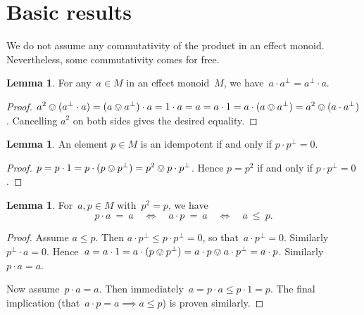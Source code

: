 \documentclass[10pt,conference]{IEEEtran}
\newcounter{counter}
\theoremstyle{definition}
\newtheorem{lemma}[counter]{Lemma}
\begin{document}
\section{Basic results}\label{sec:basicresults}

We do not assume any commutativity of the product in an effect
monoid. Nevertheless, some commutativity comes for free.

\begin{lemma}\label{lem:ssperpcommute}
    For any~$a \in M$ in an effect monoid~$M$,
        we have~$a\cdot a^\perp = a^\perp \cdot a$.
\end{lemma}
\begin{proof}
    $a^2 \ovee  (a^\perp
    \cdot a) = (a\ovee a^\perp) \cdot a  = 1\cdot a = a = a\cdot 1 = a \cdot (a\ovee a^\perp) = a^2 \ovee  (a
    \cdot a^\perp)$. Cancelling $a^2$ on both sides gives the desired
    equality.
\end{proof}

\begin{lemma}
    \label{lem:idempotentiff}
    An element $p\in M$ is an idempotent if and only if $p\cdot p^\perp = 0$.
\end{lemma}
\begin{proof}
    $p = p\cdot 1 = p\cdot (p\ovee p^\perp) = p^2 \ovee p\cdot p^\perp$. Hence $p=p^2$ if and only if $p\cdot p^\perp = 0$.
\end{proof}

\begin{lemma}\label{lem:preserveunderidempotent}
    For~$a, p \in M$ with~$p^2=p$, we have
    \begin{equation*}
            p \cdot a \ =\  a \quad \iff \quad
            a \cdot p \ =\  a \quad \iff \quad
            a \ \leq\  p.
    \end{equation*}
\end{lemma}
\begin{proof}
Assume $a\leq p$.
Then $a\cdot p^\perp \leq p\cdot p^\perp = 0$, so
    that~$a \cdot p^\perp = 0$. Similarly $p^\perp \cdot a = 0$.
     Hence~$a=a\cdot 1=a\cdot (p\ovee p^\perp) = a\cdot p \ovee a \cdot p^\perp
        = a\cdot p$. Similarly~$p \cdot a = a$.

Now assume~$p \cdot a = a$.
Then immediately~$a = p\cdot a \leq p \cdot 1 = p$.
    The final implication (that~$a \cdot p = a \implies a \leq p$) is proven
    similarly.
\end{proof}
\end{document}
